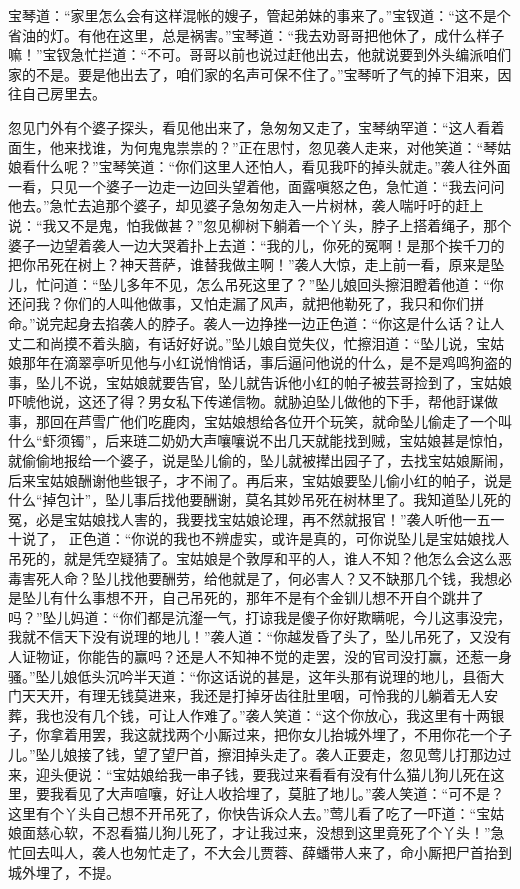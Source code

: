 \documentclass[12pt,oneside]{book}
\begin{document}
宝琴道：“家里怎么会有这样混帐的嫂子，管起弟妹的事来了。”宝钗道：“这不是个省油的灯。有他在这里，总是祸害。”宝琴道：“我去劝哥哥把他休了，成什么样子嘛！”宝钗急忙拦道：“不可。哥哥以前也说过赶他出去，他就说要到外头编派咱们家的不是。要是他出去了，咱们家的名声可保不住了。”宝琴听了气的掉下泪来，因往自己房里去。

忽见门外有个婆子探头，看见他出来了，急匆匆又走了，宝琴纳罕道：“这人看着面生，他来找谁，为何鬼鬼祟祟的？”正在思忖，忽见袭人走来，对他笑道：“琴姑娘看什么呢？”宝琴笑道：“你们这里人还怕人，看见我吓的掉头就走。”袭人往外面一看，只见一个婆子一边走一边回头望着他，面露嗔怒之色，急忙道：“我去问问他去。”急忙去追那个婆子，却见婆子急匆匆走入一片树林，袭人喘吁吁的赶上说：“我又不是鬼，怕我做甚？”忽见柳树下躺着一个丫头，脖子上搭着绳子，那个婆子一边望着袭人一边大哭着扑上去道：“我的儿，你死的冤啊！是那个挨千刀的把你吊死在树上？神天菩萨，谁替我做主啊！”袭人大惊，走上前一看，原来是坠儿，忙问道：“坠儿多年不见，怎么吊死这里了？”坠儿娘回头擦泪瞪着他道：“你还问我？你们的人叫他做事，又怕走漏了风声，就把他勒死了，我只和你们拼命。”说完起身去掐袭人的脖子。袭人一边挣挫一边正色道：“你这是什么话？让人丈二和尚摸不着头脑，有话好好说。”坠儿娘自觉失仪，忙擦泪道：“坠儿说，宝姑娘那年在滴翠亭听见他与小红说悄悄话，事后逼问他说的什么，是不是鸡鸣狗盗的事，坠儿不说，宝姑娘就要告官，坠儿就告诉他小红的帕子被芸哥捡到了，宝姑娘吓唬他说，这还了得？男女私下传递信物。就胁迫坠儿做他的下手，帮他訏谋做事，那回在芦雪广他们吃鹿肉，宝姑娘想给各位开个玩笑，就命坠儿偷走了一个叫什么“虾须镯”，后来琏二奶奶大声嚷嚷说不出几天就能找到贼，宝姑娘甚是惊怕，就偷偷地报给一个婆子，说是坠儿偷的，坠儿就被撵出园子了，去找宝姑娘厮闹，后来宝姑娘酬谢他些银子，才不闹了。再后来，宝姑娘要坠儿偷小红的帕子，说是什么“掉包计”，坠儿事后找他要酬谢，莫名其妙吊死在树林里了。我知道坠儿死的冤，必是宝姑娘找人害的，我要找宝姑娘论理，再不然就报官！”袭人听他一五一十说了， 正色道：“你说的我也不辨虚实，或许是真的，可你说坠儿是宝姑娘找人吊死的，就是凭空疑猜了。宝姑娘是个敦厚和平的人，谁人不知？他怎么会这么恶毒害死人命？坠儿找他要酬劳，给他就是了，何必害人？又不缺那几个钱，我想必是坠儿有什么事想不开，自己吊死的，那年不是有个金钏儿想不开自个跳井了吗？”坠儿妈道：“你们都是沆瀣一气，打谅我是傻子你好欺瞒呢，今儿这事没完，我就不信天下没有说理的地儿！”袭人道：“你越发昏了头了，坠儿吊死了，又没有人证物证，你能告的赢吗？还是人不知神不觉的走罢，没的官司没打赢，还惹一身骚。”坠儿娘低头沉吟半天道：“你这话说的甚是，这年头那有说理的地儿，县衙大门天天开，有理无钱莫进来，我还是打掉牙齿往肚里咽，可怜我的儿躺着无人安葬，我也没有几个钱，可让人作难了。”袭人笑道：“这个你放心，我这里有十两银子，你拿着用罢，我这就找两个小厮过来，把你女儿抬城外埋了，不用你花一个子儿。”坠儿娘接了钱，望了望尸首，擦泪掉头走了。袭人正要走，忽见莺儿打那边过来，迎头便说：“宝姑娘给我一串子钱，要我过来看看有没有什么猫儿狗儿死在这里，要我看见了大声喧嚷，好让人收拾埋了，莫脏了地儿。”袭人笑道：“可不是？这里有个丫头自己想不开吊死了，你快告诉众人去。”莺儿看了吃了一吓道：“宝姑娘面慈心软，不忍看猫儿狗儿死了，才让我过来，没想到这里竟死了个丫头！”急忙回去叫人，袭人也匆忙走了，不大会儿贾蓉、薛蟠带人来了，命小厮把尸首抬到城外埋了，不提。
\end{document}
